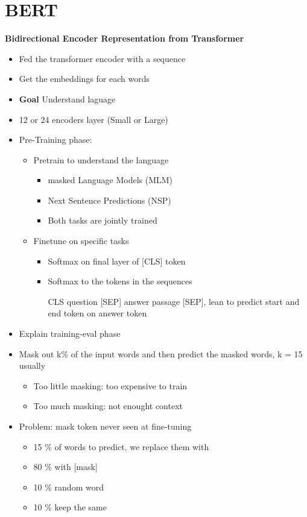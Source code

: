 \section{BERT}
\textbf{Bidirectional Encoder Representation from Transformer}
\begin{itemize}
    \item Fed the transformer encoder with a sequence
    \item Get the embeddings for each words
    \item \textbf{Goal} Understand laguage
    \item 12 or 24 encoders layer (Small or Large)
    \item Pre-Training phase:
    \begin{itemize}
        \item Pretrain to understand the language
        \begin{itemize}
            \item masked Language Models (MLM)
            \item Next Sentence Predictions (NSP) 
            \item Both tasks are jointly trained
        \end{itemize}
        \item Finetune on specific tasks
        \begin{itemize}
            \item Softmax on final layer of [CLS] token
            \item Softmax to the tokens in the sequences
            \item [CLS] question [SEP] answer passage [SEP], lean to predict start and end token on answer token
        \end{itemize}
    \end{itemize}
    \item Explain training-eval phase
    \item Mask out k\% of the input words and then predict the masked words, k = 15 usually
    \begin{itemize}
        \item Too little masking: too expensive to train
        \item Too much masking: not enought context 
    \end{itemize}
    \item Problem: mask token never seen at fine-tuning
    \begin{itemize}
        \item 15 \% of words to predict, we replace them with
        \item 80 \% with [mask]
        \item 10 \% random word
        \item 10 \% keep the same
    \end{itemize}
\end{itemize}

